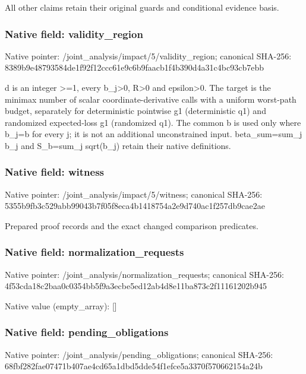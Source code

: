 \documentclass[10pt,a4paper]{article}
\begin{document}
\begingroup\raggedright\sloppy All other claims retain their original guards and conditional evidence basis.\par\endgroup

\subsubsection{Native field: validity\_\allowbreak{}region}
Native pointer: /joint\_\allowbreak{}analysis/impact/5/validity\_\allowbreak{}region; canonical SHA-256: 8389b9e48793584de1f92f12ccc61e9c6b9faacb1f4b390d4a31c4bc93cb7ebb

\begingroup\raggedright\sloppy d is an integer >=\allowbreak{}1,\allowbreak{} every b\_\allowbreak{}j>0,\allowbreak{} R>0 and epsilon>0. The target is the minimax number of scalar coordinate-derivative calls with a uniform worst-path budget,\allowbreak{} separately for deterministic pointwise g1 (deterministic q1) and randomized expected-loss g1 (randomized q1). The common b is used only where b\_\allowbreak{}j=\allowbreak{}b for every j;\allowbreak{} it is not an additional unconstrained input. beta\_\allowbreak{}sum=\allowbreak{}sum\_\allowbreak{}j b\_\allowbreak{}j and S\_\allowbreak{}b=\allowbreak{}sum\_\allowbreak{}j sqrt(b\_\allowbreak{}j) retain their native definitions.\par\endgroup

\subsubsection{Native field: witness}
Native pointer: /joint\_\allowbreak{}analysis/impact/5/witness; canonical SHA-256: 5355b9fb3c529abb99043b7f05f8eca4b1418754a2e9d740ac1f257db9cae2ae

\begingroup\raggedright\sloppy Prepared proof records and the exact changed comparison predicates.\par\endgroup

\subsubsection{Native field: normalization\_\allowbreak{}requests}
Native pointer: /joint\_\allowbreak{}analysis/normalization\_\allowbreak{}requests; canonical SHA-256: 4f53cda18c2baa0c0354bb5f9a3ecbe5ed12ab4d8e11ba873c2f11161202b945

Native value (empty\_\allowbreak{}array): []

\subsubsection{Native field: pending\_\allowbreak{}obligations}
Native pointer: /joint\_\allowbreak{}analysis/pending\_\allowbreak{}obligations; canonical SHA-256: 68fbf282fae07471b407ae4cd65a1dbd5dde54f1efce5a3370f570662154a24b
\end{document}
